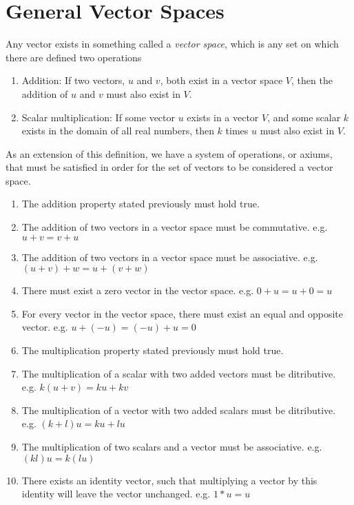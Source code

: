 \section{General Vector Spaces}\label{generalvectorspaces}
Any vector exists in something called a \emph{vector space}, which is any set on
which there are defined two operations
\begin{enumerate}
    \item Addition: If two vectors, $u$ and $v$, both exist in a vector space
        $V$, then the addition of $u$ and $v$ must also exist in $V$.    
    \item Scalar multiplication: If some vector $u$ exists in a vector $V$,
        and some scalar $k$ exists in the domain of all real numbers, then $k$
        times $u$ must also exist in $V$.
\end{enumerate}
As an extension of this definition, we have a system of operations, or axiums,
that must be satisfied in order for the set of vectors to be considered a vector
space. 
\begin{enumerate}
    \item The addition property stated previously must hold true.
    \item The addition of two vectors in a vector space must be commutative.
        e.g. $u + v = v + u$
    \item The addition of two vectors in a vector space must be associative.
        e.g. $(u + v) + w = u + (v + w)$
    \item There must exist a zero vector in the vector space. e.g. $0 + u = u +
        0 = u$
    \item For every vector in the vector space, there must exist an equal
        and opposite vector. e.g. $u + (-u) = (-u) + u = 0$
    \item The multiplication property stated previously must hold true.
    \item The multiplication of a scalar with two added vectors must be
        ditributive. e.g. $k(u + v) = ku + kv$ 
    \item The multiplication of a vector with two added scalars must be
        ditributive. e.g. $(k + l)u = ku + lu$ 
    \item The multiplication of two scalars and a vector must be associative.
        e.g. $(kl)u = k(lu)$
    \item There exists an identity vector, such that multiplying a vector by
        this identity will leave the vector unchanged. e.g. $1 * u = u$
\end{enumerate}

